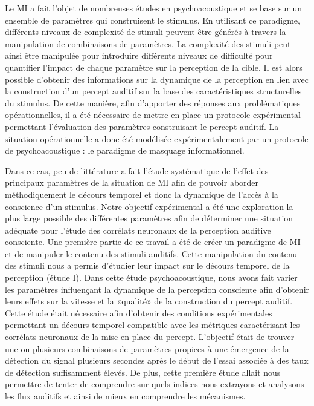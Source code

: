 Le MI a fait l'objet de nombreuses études en psychoacoustique et se base sur un ensemble de paramètres qui construisent le stimulus. 
En utilisant ce paradigme, différents niveaux de complexité de stimuli peuvent être générés à travers la manipulation de combinaisons de paramètres. 
La complexité des stimuli peut ainsi être manipulée pour introduire différents niveaux de difficulté pour quantifier l'impact de chaque paramètre sur la perception de la cible. 
Il est alors possible d'obtenir des informations sur la dynamique de la perception en lien avec la construction d'un percept auditif sur la base des caractéristiques structurelles du stimulus. 
De cette manière, afin d'apporter des réponses aux problématiques opérationnelles, il a été nécessaire de mettre en place un protocole expérimental permettant l'évaluation des paramètres construisant le percept auditif. 
La situation opérationnelle a donc été modélisée expérimentalement par un protocole de psychoacoustique : le paradigme de masquage informationnel. 

Dans ce cas, peu de littérature a fait l'étude systématique de l'effet des principaux paramètres de la situation de MI afin de pouvoir aborder méthodiquement le décours temporel et donc la dynamique de l'accès à la conscience d'un stimulus. 
Notre objectif expérimental a été une exploration la plus large possible des différentes paramètres afin de déterminer une situation adéquate pour l'étude des corrélats neuronaux de la perception auditive consciente. 
Une première partie de ce travail a été de créer un paradigme de MI et de manipuler le contenu des stimuli auditifs. 
Cette manipulation du contenu des stimuli nous a permis d'étudier leur impact sur le décours temporel de la perception (étude I). 
Dans cette étude psychoacoustique, nous avons fait varier les paramètres influençant la dynamique de la perception consciente afin d'obtenir leurs effets sur la vitesse et la «qualité» de la construction du percept auditif.
Cette étude était nécessaire afin d'obtenir des conditions expérimentales permettant un décours temporel compatible avec les métriques caractérisant les corrélats neuronaux de la mise en place du percept.
L'objectif était de trouver une ou plusieurs combinaisons de paramètres propices à une émergence de la détection du signal plusieurs secondes après le début de l'essai associée à des taux de détection suffisamment élevés. 
De plus, cette première étude allait nous permettre de tenter de comprendre sur quels indices nous extrayons et analysons les flux auditifs et ainsi de mieux en comprendre les mécanismes. 

